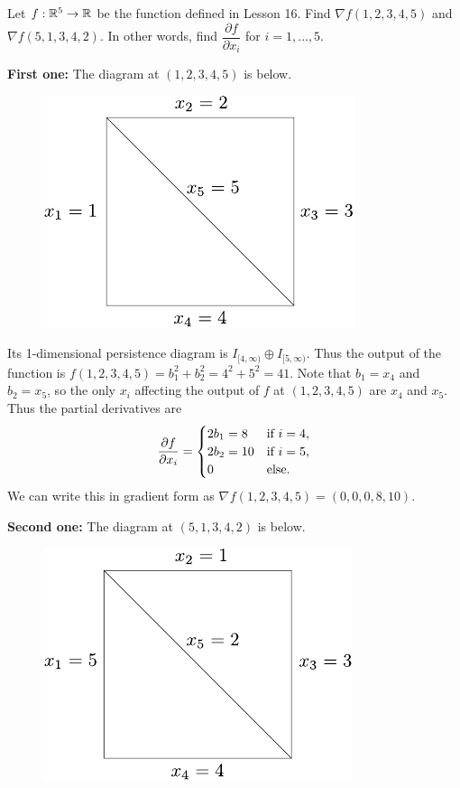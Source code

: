 \documentclass[twoside,10pt]{article}
\begin{document}

\begin{exer}
        Let $f: \mathbb{R}^5 \to \mathbb{R}$ be the function defined in Lesson 16. Find $\nabla f(1, 2, 3, 4, 5)$ and $\nabla f(5, 1, 3, 4, 2)$. In other words, find $\dfrac{\partial f}{\partial x_i}$ for $i = 1, \dots, 5$.
\end{exer}

\textbf{First one:} The diagram at $(1,2,3,4,5)$ is below.

\begin{figure}[H]
	\centering
	\includegraphics[scale=1]{fig/1a.pdf}
\end{figure}

Its 1-dimensional persistence diagram is $I_{[4,\infty)}\oplus I_{[5,\infty)}$. Thus the output of the function is $f(1,2,3,4,5) =  b_1^2 + b_2^2 = 4^2 + 5^2 = 41$. Note that $b_1=x_4$ and $b_2=x_5$, so the only $x_i$ affecting the output of $f$ at $(1,2,3,4,5)$ are $x_4$ and $x_5$. Thus the partial derivatives are
\[
\frac{\partial f}{\partial x_i} =
\begin{cases}
	2 b_1 = 8 & \text{if } i=4,\\
	2 b_2 = 10 & \text{if } i=5,\\
	0 & \text{else}.
\end{cases}
\] 
We can write this in gradient form as $\nabla_{}f(1,2,3,4,5) = (0,0,0,8,10)$.

\textbf{Second one:} The diagram at $(5,1,3,4,2)$ is below.

\begin{figure}[H]
	\centering
	\includegraphics[scale=1]{fig/1b.pdf}
\end{figure}
\end{document}
